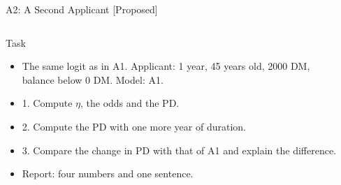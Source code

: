 \begin{frame}{A2: A Second Applicant [Proposed]}
\propsub
\itemsize{\scriptsize}
\begin{columns}[T]
\begin{column}{\taskw}
\begin{block}{Task}
\begin{itemize}
    \item The same logit as in A1. Applicant: 1 year, 45 years old, 2000 DM, balance below 0 DM. Model: A1.
    \item 1. Compute $\eta$, the odds and the PD.
    \item 2. Compute the PD with one more year of duration.
    \item 3. Compare the change in PD with that of A1 and explain the difference.
    \item Report: four numbers and one sentence.
\end{itemize}
\end{block}
\end{column}
\begin{column}{\solw}
\end{column}
\end{columns}
\end{frame}

